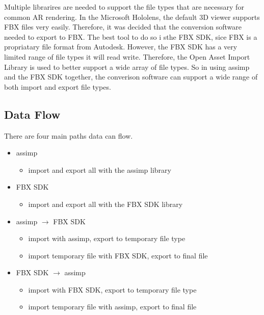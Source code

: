     Multiple librarires are needed to support the file types that are necessary for common AR rendering.  In the Microsoft Hololens, the default
    3D viewer supports FBX files very easily.  Therefore, it was decided that the conversion software needed to export to FBX.  The best tool to do 
    so i sthe FBX SDK, sice FBX is a propriatary file format from Autodesk.  However, the FBX SDK has a very limited range of file types it will read write.
    Therefore, the Open Asset Import Library is used to better support a wide array of file types.  So in using assimp and the FBX SDK together,
    the converison software can support a wide range of both import and export file types.

    \subsection{Data Flow}
        There are four main paths data can flow.
        \begin{itemize}
            \item assimp
            \begin{itemize}
                \item import and export all with the assimp library
            \end{itemize}
            
            \item FBX SDK
            \begin{itemize}
                \item import and export all with the FBX SDK library
            \end{itemize}

            \item assimp $\rightarrow$ FBX SDK
            \begin{itemize}
                \item import with assimp, export to temporary file type
                \item import temporary file with FBX SDK, export to final file 
            \end{itemize}

            \item FBX SDK $\rightarrow$ assimp
            \begin{itemize}
                \item import with FBX SDK, export to temporary file type
                \item import temporary file with assimp, export to final file 
            \end{itemize}
        \end{itemize}
        
